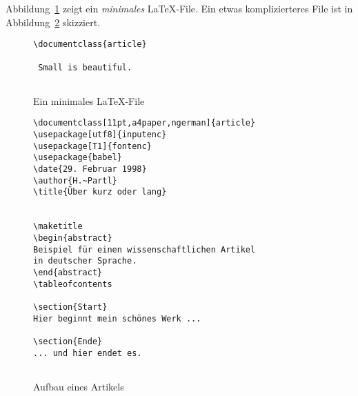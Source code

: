 Abbildung~\ref{mini} zeigt ein \emph{minimales} \LaTeX-File. Ein etwas 
komplizierteres File ist in Abbildung~\ref{dokument} skizziert.
 
\begin{figure}[hbp] %
\begin{lminipage}{6cm}
\begin{lstlisting}
\documentclass{article}

 Small is beautiful.
 
\end{lstlisting}
\end{lminipage}
\caption{Ein minimales \LaTeX-File} \label{mini}
\end{figure}

\begin{figure}[hbtp]
\begin{lminipage}{10cm}
\begin{lstlisting}
\documentclass[11pt,a4paper,ngerman]{article}
\usepackage[utf8]{inputenc}
\usepackage[T1]{fontenc}
\usepackage{babel}
\date{29. Februar 1998}
\author{H.~Partl}
\title{Über kurz oder lang}


\maketitle
\begin{abstract}
Beispiel für einen wissenschaftlichen Artikel
in deutscher Sprache.
\end{abstract}
\tableofcontents

\section{Start}
Hier beginnt mein schönes Werk ...

\section{Ende}
... und hier endet es.


\end{lstlisting}
\end{lminipage}
\caption{Aufbau eines Artikels} \label{dokument}
\end{figure}
 
 
